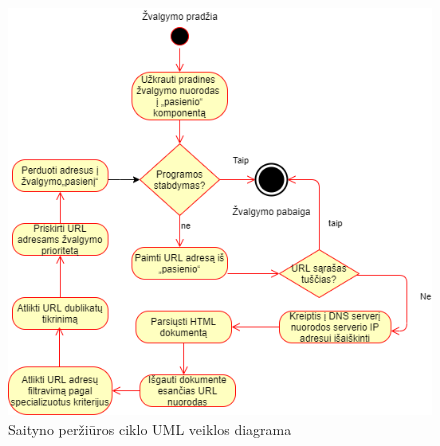 \begin{figure}[ht!]
\centering
\includegraphics[scale=0.6]{img/Web_Crawler_Activity_Diagram.png}
\caption{Saityno peržiūros ciklo UML veiklos diagrama \cite{CategoriesOfWebCrawlersAndOverview}}
\label{fig:system_activity_diagram}
\end{figure}